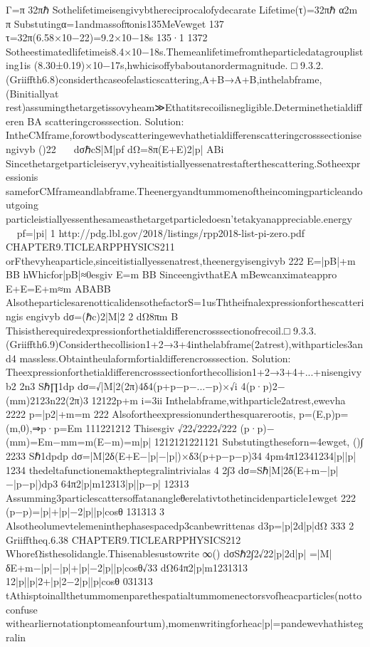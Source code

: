 {{{{{{{{{{{Γ=π
32πℏ
Sothelifetimeisengivybthereciprocalofydecarate
Lifetime(τ)=32πℏ
α2m
π
Substutingα=1andmassofπonis135MeVewget
137
τ=32π(6.58×10−22)=9.2×10−18s
135·1
1372
Sotheestimatedlifetimeis8.4×10−18s.Themeanlifetimefromtheparticledatagrouplisting1is
(8.30±0.19)×10−17s,hwhicisoffybaboutanordermagnitude.
□
9.3.2.(Griiffth6.8)considerthcaseofelasticscattering,A+B→A+B,inthelabframe,(Binitiallyat
rest)assumingthetargetissovyheam≫Ethatitsrecoilisnegligible.Determinethetialdifferen
BA
scatteringcrosssection.
Solution:
IntheCMframe,forowtbodyscatteringewevhathetialdifferenscatteringcrosssectionisengivyb
()22

dσℏcS|M|pf
dΩ=8π(E+E)2|p|
ABi
Sincethetargetparticleiseryv,vyheaitistiallyessenatrestafterthescattering.Sotheexpressionis
sameforCMframeandlabframe.Theenergyandtummomenoftheincomingparticleandoutgoing
particleistiallyessenthesameasthetargetparticledoesn’tetakyanappreciable.energy


pf=|pi|
1
http://pdg.lbl.gov/2018/listings/rpp2018-list-pi-zero.pdf
CHAPTER9.TICLEARPPHYSICS211
orFthevyheaparticle,sinceitistiallyessenatrest,theenergyisengivyb
222
E=|pB|+m
BB
hWhicfor|pB|≈0esgiv
E=m
BB
SinceengivthatEA≪mBewcanximateappro
E+E=E+m≈m
ABABB
AlsotheparticlesarenotticalidensothefactorS=1usThtheifnalexpressionforthescatteringis
engivyb
dσ=(ℏc)2|M|2
2
dΩ8πm
B
Thisistherequiredexpressionforthetialdifferencrosssectionofrecoil.□
9.3.3.(Griiffth6.9)Considerthecollision1+2→3+4inthelabframe(2atrest),withparticles3and4
massless.Obtaintheulaformfortialdifferencrosssection.
Solution:
Theexpressionforthetialdifferencrosssectionforthecollision1+2→3+4+...+nisengivyb2
2n3
Sℏ∏1dp
dσ=√|M|2(2π)4δ4(p+p−p−...−p)×√i
4(p·p)2−(mm)2123n22(2π)3
12122p+m
i=3ii
Inthelabframe,withparticle2atrest,ewevha
2222
p=|p2|+m=m
222
Alsofortheexpressionunderthesquarerootis,
p=(E,p)p=(m,0),⇒p·p=Em
111221212
Thisesgiv
√22√2222√222
(p·p)−(mm)=Em−mm=m(E−m)=m|p|
1212121221121
Substutingtheseforn=4ewget,
()∫
2233
Sℏ1dpdp
dσ=|M|2δ(E+E−|p|−|p|)×δ3(p+p−p−p)34
4pm4π12341234|p||p|
1234
thedeltafunctionemaktheptegralintrivialas
4
2∫3
dσ=Sℏ|M|2δ(E+m−|p|−|p−p|)dp3
64π2|p|m12313|p||p−p|
12313
Assumming3particlescattersoffatanangleθerelativtothetincidenparticle1ewget
222
(p−p)=|p|+|p|−2|p||p|cosθ
131313
3
Alsotheolumevtelemeninthephasespacedp3canbewrittenas
d3p=|p|2d|p|dΩ
333
2
Griifftheq.6.38
CHAPTER9.TICLEARPPHYSICS212
WhoreΩisthesolidangle.Thisenablesustowrite
∞()
dσSℏ2∫2√22|p|2d|p|
=|M|δE+m−|p|−|p|+|p|−2|p||p|cosθ√33
dΩ64π2|p|m1231313
12|p||p|2+|p|2−2|p||p|cosθ
031313
tAthisptoinallthetummomenparethespatialtummomenectorsvofheacparticles(nottoconfuse
withearliernotationptomeanfourtum),momenwritingforheac|p|=pandewevhathistegralin
}}}}}}}}}}}
